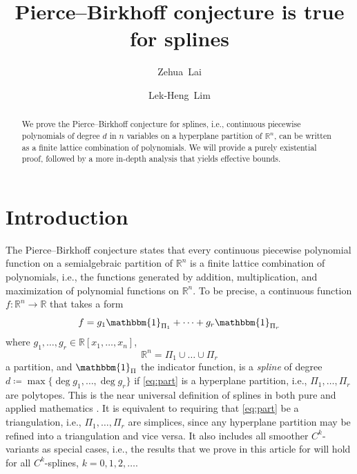 \documentclass[11pt]{amsart}
\theoremstyle{plain}
\theoremstyle{definition}
\begin{document}
\title{Pierce--Birkhoff conjecture is true for splines}
\author[Z.~Lai]{Zehua~Lai}
\address{Department of Mathematics, University of Texas, Austin, TX 78712}
\author[L.-H.~Lim]{Lek-Heng~Lim}
\address{Computational and Applied Mathematics Initiative, Department of Statistics,
University of Chicago, Chicago, IL 60637}

\begin{abstract}
We prove the Pierce--Birkhoff conjecture for splines, i.e.,  continuous piecewise polynomials of degree $d$ in $n$ variables on a hyperplane partition of $\mathbb{R}^n$, can be written as a finite lattice combination of polynomials. We will provide a purely existential proof, followed by a more in-depth analysis that yields effective bounds.
\end{abstract}
\maketitle

\section{Introduction}\label{sec:intro}

The Pierce--Birkhoff conjecture states that every continuous piecewise polynomial function on a semialgebraic partition of $\mathbb{R}^n$ is a finite lattice combination of polynomials, i.e., the functions generated by addition, multiplication, and maximization of polynomial functions on $\mathbb{R}^n$. To be precise, a continuous function $f : \mathbb{R}^n \to \mathbb{R}$ that takes a form
\begin{equation}\label{eq:def}
f = g_1 \mathbbm{1}_{\Pi_1} + \dots +  g_r \mathbbm{1}_{\Pi_r}
\end{equation}
where $g_1,\dots,g_r \in \mathbb{R}[x_1,\dots,x_n]$,
\begin{equation}\label{eq:part}
\mathbb{R}^n = \Pi_1 \cup \dots \cup \Pi_r
\end{equation}
a partition, and $\mathbbm{1}_{\Pi}$ the indicator function, is a \emph{spline} of degree $d \coloneqq \max \{ \deg g_1, \dots, \deg g_r \}$ if \eqref{eq:part} is a hyperplane partition, i.e., $\Pi_1,\dots,\Pi_r$ are polytopes. This is the near universal definition of splines in both pure \cite{Billera, Billera1989, Plaumann2012} and applied mathematics \cite{Chui, BoxSpline, Wang2002}. It is equivalent to requiring that \eqref{eq:part} be a triangulation, i.e., $\Pi_1,\dots,\Pi_r$ are simplices, since any hyperplane partition may be refined into a triangulation and vice versa. It also includes all smoother $C^k$-variants as special cases, i.e., the results that we prove in this article for will hold for all $C^k$-splines, $k = 0,1,2,\dots.$
\end{document}
